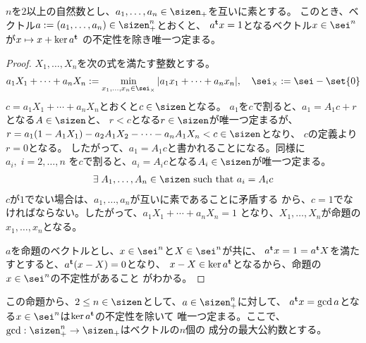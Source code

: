 {	\begin{proposition}[Bezoutの恒等式その二]\label{prop:Bezoutの恒等式その二} %
		$n$を$2$以上の自然数とし、$a_1,\dots,a_n\in\sizen_+$を互いに素とする。
		このとき、ベクトル$a:=(a_1,\dots,a_n)\in\sizen_+^n$とおくと、
		$a^{\mathbf{t}} x=1$となるベクトル$x\in\sei^n$が$x\mapsto x+\ker a^{\mathbf{t}}$
		の不定性を除き唯一つ定まる。
	\end{proposition} %
	\begin{proof} %
		$X_1,\dots,X_n$を次の式を満たす整数とする。
		\begin{equation*}\begin{split}
			a_1X_1 +\cdots+ a_nX_n := \min_{x_1,\dots,x_n\in\sei_\times} 
			|a_1x_1+\cdots+a_nx_n|,\quad \sei_\times := \sei - \set{0}
		\end{split}\end{equation*}
		$c=a_1X_1+\cdots+a_nX_n$とおくと$c\in\sizen$となる。
		$a_1$を$c$で割ると、$a_1=A_1c+r$となる$A\in\sizen$と、
		$r<c$となる$r\in\sizen$が唯一つ定まるが、
		$r=a_1(1-A_1X_1)-a_2A_1X_2-\cdots-a_nA_1X_n<c\in\sizen$となり、
		$c$の定義より$r=0$となる。
		したがって、$a_1=A_1c$と書かれることになる。同様に$a_i,\; i=2,\dots,n$
		を$c$で割ると、$a_i=A_ic$となる$A_i\in\sizen$が唯一つ定まる。
		\begin{equation*}\begin{split}
			\exists\; A_1,\dots,A_n\in\sizen \text{ such that } a_i = A_ic
		\end{split}\end{equation*}
		$c$が$1$でない場合は、$a_1,\dots,a_n$が互いに素であることに矛盾する
		から、$c=1$でなければならない。したがって、$a_1X_1+\cdots+a_nX_n=1$
		となり、$X_1,\dots,X_n$が命題の$x_1,\dots,x_n$となる。

		$a$を命題のベクトルとし、$x\in\sei^n$と$X\in\sei^n$が共に、
		$a^{\mathbf{t}} x=1=a^{\mathbf{t}} X$を満たすとすると、$a^{\mathbf{t}}(x-X)=0$となり、
		$x-X\in\ker a^{\mathbf{t}}$となるから、命題の$x\in\sei^n$の不定性があること
		がわかる。
	\end{proof} %

	この命題から、$2\le n\in\sizen$として、$a\in\sizen_+^n$に対して、
	$a^{\mathbf{t}} x=\gcd a$となる$x\in\sei^n$は$\ker a^{\mathbf{t}}$の不定性を除いて
	唯一つ定まる。ここで、$\gcd:\sizen_+^n\to\sizen_+$はベクトルの$n$個の
	成分の最大公約数とする。
	
}
